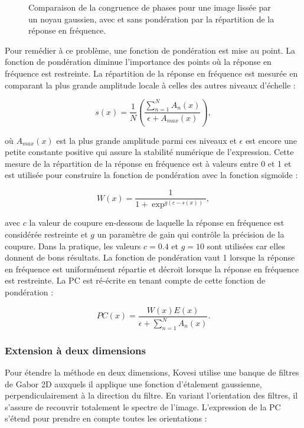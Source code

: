 \begin{figure}
    \caption[Congruence de phases pour une image lissée par noyau gaussien]{Comparaison de la congruence de phases pour une image lissée par un noyau gaussien, avec et sans pondération par la répartition de la réponse en fréquence.}
    \label{fig:phase-congruency-spread}
\end{figure}

Pour remédier à ce problème, une fonction de pondération est mise au point. La fonction de pondération diminue l'importance des points où la réponse en fréquence est restreinte. La répartition de la réponse en fréquence est mesurée en comparant la plus grande amplitude locale à celles des autres niveaux d'échelle :

\begin{equation}
    s(x) = \frac1N\left(\frac{\sum_{n=1}^{N}A_n(x)}{\epsilon + A_{max}(x)}\right),
\end{equation}

où $A_{max}(x)$ est la plus grande amplitude parmi ces niveaux et $\epsilon$ est encore une petite constante positive qui assure la stabilité numérique de l'expression. Cette mesure de la répartition de la réponse en fréquence est à valeurs entre 0 et 1 et est utilisée pour construire la fonction de pondération avec la fonction sigmoïde :

\begin{equation}
    W(x) = \frac{1}{1 + \exp^{g(c-s(x))}},
\end{equation}

avec $c$ la valeur de coupure en-dessous de laquelle la réponse en fréquence est considérée restreinte et $g$ un paramètre de gain qui contrôle la précision de la coupure. Dans la pratique, les valeurs $c = 0.4$ et $g = 10$ sont utilisées car elles donnent de bons résultats. La fonction de pondération vaut 1 lorsque la réponse en fréquence est uniformément répartie et décroit lorsque la réponse en fréquence est restreinte. La PC est ré-écrite en tenant compte de cette fonction de pondération :

\begin{equation}
    PC(x) = \frac{W(x)E(x)}{\epsilon + \sum_{n=1}^{N} A_n(x)}.
\end{equation}

\subsubsection{Extension à deux dimensions}

Pour étendre la méthode en deux dimensions, Kovesi utilise une banque de filtres de Gabor 2D auxquels il applique une fonction d'étalement gaussienne, perpendiculairement à la direction du filtre. En variant l'orientation des filtres, il s'assure de recouvrir totalement le spectre de l'image. L'expression de la PC s'étend pour prendre en compte toutes les orientations :

